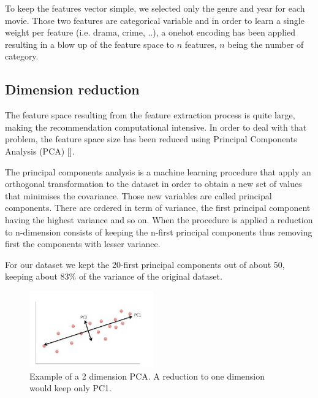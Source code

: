 \documentclass[letterpaper]{article}
\begin{document}
To keep the features vector simple, we selected only the genre and year for each movie. Those two features are categorical variable and in order to learn a single weight per feature (i.e. drama, crime, ..), a onehot encoding has been applied resulting in a blow up of the feature space to $n$ features, $n$ being the number of category.

\begin{table}[h]
\vskip 0.25cm
\caption{Movies feature space}
\end{table}


\subsection{Dimension reduction}

The feature space resulting from the feature extraction process is quite large, making the recommendation computational intensive.
In order to deal with that problem, the feature space size has been reduced using Principal Components Analysis (PCA) [\cite{principalcompanalysis}].

The principal components analysis is a machine learning procedure that apply an orthogonal transformation to the dataset in order to obtain a new set of values that minimises the covariance. Those new variables are called principal components. There are ordered in term of variance, the first principal component having the highest variance and so on. When the procedure is applied a reduction to n-dimension consists of keeping the n-first principal components thus removing first the components with lesser variance.

For our dataset we kept the 20-first principal components out of about 50, keeping about 83\% of the variance of the original dataset.

\begin{figure}[H]
\begin{center}
\includegraphics[width=2.1in]{img/pca.png}
\caption{Example of a 2 dimension PCA. A reduction to one dimension would keep only PC1.}
\label{pca}
\end{center}
\end{figure}
\end{document}
